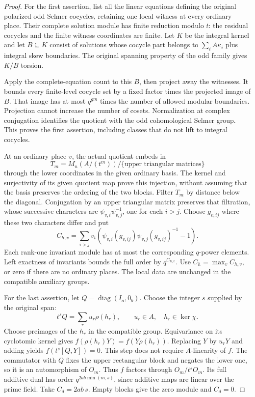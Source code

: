 \begin{proof}
For the first assertion, list all the linear equations defining
the original polarized odd Selmer cocycles, retaining one local
witness at every ordinary place. Their complete solution module
has finite reduction modulo $t$: the residual cocycles and the
finite witness coordinates are finite. Let $K$ be the integral
kernel and let $B\subseteq K$ consist of solutions whose cocycle
part belongs to $\sum_iA\kappa_i$ plus integral skew boundaries.
The original spanning property of the odd family gives $K/B$
torsion.

Apply the complete-equation count to this $B$, then project away
the witnesses. It bounds every finite-level cocycle set by a
fixed factor times the projected image of $B$. That image has
at most $q^{gm}$ times the number of allowed modular boundaries.
Projection cannot increase the number of cosets. Normalization
at complex conjugation identifies the quotient with the odd
cohomological Selmer group. This proves the first assertion,
including classes that do not lift to integral cocycles.

At an ordinary place $v$, the actual quotient embeds in
\[
 T_m=M_n(A/(t^m))/\{\text{upper triangular matrices}\}
\]
through the lower coordinates in the given ordinary basis.
The kernel and surjectivity of its given quotient map prove this
injection, without assuming that the basis preserves the ordering
of the two blocks. Filter $T_m$ by distance below the diagonal.
Conjugation by an upper triangular matrix preserves that filtration,
whose successive characters are $\psi_{v,i}\psi_{v,j}^{-1}$,
one for each $i>j$. Choose $g_{v,ij}$ where these two characters
differ and put
\[
 C_{h,v}=\sum_{i>j}v_t\!\left(
       \psi_{v,i}(g_{v,ij})\psi_{v,j}(g_{v,ij})^{-1}-1\right).
\]
Each rank-one invariant module has at most the corresponding
$q$-power elements. Left exactness of invariants bounds the full
order by $q^{C_{h,v}}$. Use $C_h=\max_vC_{h,v}$, or zero if
there are no ordinary places. The local data are unchanged in
the compatible auxiliary groups.

For the last assertion, let $Q=\operatorname{diag}(I_a,0_b)$.
Choose the integer $s$ supplied by the original span:
\[
                       t^sQ=\sum_r u_r\rho(h_r),
 \qquad u_r\in A,\quad h_r\in\ker\chi.
\]
Choose preimages of the $h_r$ in the compatible group.
Equivariance on its cyclotomic kernel gives
$f(\rho(h_r)Y)=f(Y\rho(h_r))$. Replacing $Y$ by $u_rY$
and adding yields $f(t^s[Q,Y])=0$. This step does not require
$A$-linearity of $f$.
The commutator with $Q$ fixes the upper rectangular block and
negates the lower one, so it is an automorphism of $O_m$.
Thus $f$ factors through $O_m/t^sO_m$. Its full additive dual
has order $q^{2ab\min(m,s)}$, since additive maps are linear
over the prime field. Take $C_d=2ab\,s$. Empty blocks give
the zero module and $C_d=0$.
\end{proof}

